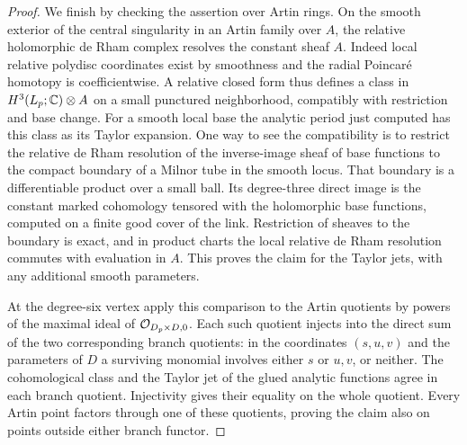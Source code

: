 \begin{proof}
We finish by checking the assertion over Artin rings. On the smooth
exterior of the central singularity in an Artin family over $A$, the
relative holomorphic de Rham complex resolves the constant sheaf $A$.
Indeed local relative polydisc coordinates exist by smoothness and
the radial Poincar\'e homotopy is coefficientwise. A relative closed
form thus defines a class in $H^3(L_p;\mathbb C)\otimes A$ on a small
punctured neighborhood, compatibly with restriction and base change.
For a smooth local base the analytic period just computed has this
class as its Taylor expansion. One way to see the compatibility is
to restrict the relative de Rham resolution of the inverse-image
sheaf of base functions to the compact boundary of a Milnor tube in
the smooth locus. That boundary is a differentiable product over a
small ball. Its degree-three direct image is the constant marked
cohomology tensored with the holomorphic base functions, computed
on a finite good cover of the link. Restriction of sheaves to the
boundary is exact, and in product charts the local relative de Rham
resolution commutes with evaluation in $A$. This proves the claim for
the Taylor jets, with any additional smooth parameters.

At the degree-six vertex apply this comparison to the Artin quotients
by powers of the maximal ideal of $\mathcal O_{D_p\times D,0}$. Each such
quotient injects into the direct sum of the two corresponding branch
quotients: in the coordinates $(s,u,v)$ and the parameters of $D$ a
surviving monomial involves either $s$ or $u,v$, or neither. The
cohomological class and the Taylor jet of the glued analytic functions
agree in each branch quotient. Injectivity gives their equality on
the whole quotient. Every Artin point factors through one of these
quotients, proving the claim also on points outside either branch
functor.
\end{proof}

